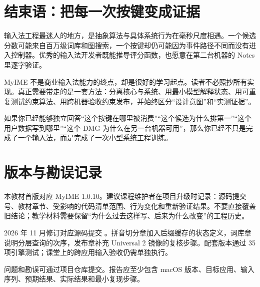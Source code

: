 \chapter*{结束语：把每一次按键变成证据}

输入法工程最迷人的地方，是抽象算法与具体系统行为在毫秒尺度相遇。一个候选分数可能来自百万级词库和图搜索，一个按键却仍可能因为事件路径不同而没有进入控制器。优秀的输入法开发者既能推导评分函数，也愿意在第二台机器的 Notes 里逐字验证。

MyIME 不是商业输入法能力的终点，却是很好的学习起点。读者不必照抄所有实现。真正需要带走的是一套方法：分离核心与系统、用最小模型解释状态、用可重复测试约束算法、用跨机器验收约束发布，并始终区分“设计意图”和“实测证据”。

\begin{summarybox}
如果你已经能够独立回答“这个按键在哪里被消费”“这个候选为什么排第一”“这个用户数据写到哪里”“这个 DMG 为什么在另一台机器可用”，那么你已经不只是完成了一个输入法，而是完成了一次小型系统工程训练。
\end{summarybox}

\chapter*{版本与勘误记录}

本教材首版对应 MyIME 1.0.10。建议课程维护者在项目升级时记录：源码提交号、教材章节、受影响的代码清单范围、行为变化和重新验证结果。不要直接覆盖旧结论；教学材料需要保留“为什么过去这样写、后来为什么改变”的工程历史。

2026 年 11 月修订对应源码提交 。拼音切分章加入后缀缓存的状态定义，词库章说明分层查询的次序，发布章补充 Universal 2 镜像的复核步骤。配套版本通过 35 项引擎测试；课堂上的跨应用输入验收仍需单独执行。

问题和勘误可通过项目仓库提交。报告应至少包含 macOS 版本、目标应用、输入序列、预期结果、实际结果和最小复现步骤。
